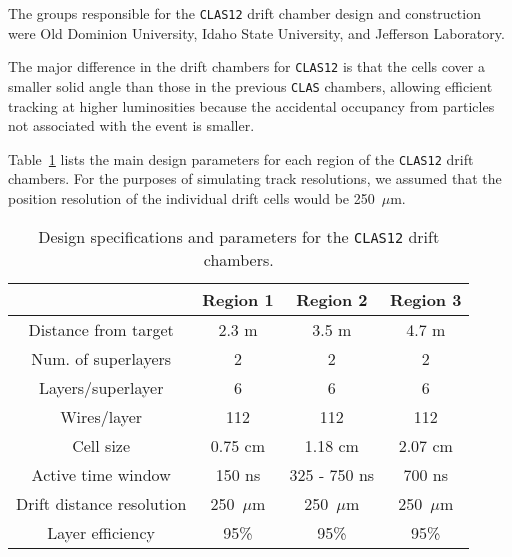 The groups responsible for the {\tt CLAS12} drift
chamber design and construction were Old Dominion University, Idaho State
University, and Jefferson Laboratory.

The major difference in the drift chambers for {\tt CLAS12} is that the 
cells cover a smaller solid angle than those in the previous {\tt CLAS} 
chambers, allowing efficient tracking at higher luminosities because the 
accidental occupancy from particles not associated with the event is smaller.  

Table~\ref{fwd-dc-design-parms} lists the main design parameters for each 
region of the {\tt CLAS12} drift chambers.  For the purposes of simulating 
track resolutions, we assumed that the position resolution of the individual 
drift cells would be 250~$\mu$m.  

\small{
\begin{table}[ht]
\begin{center}
\begin{tabular}{||c|c|c|c||} \hline \hline
            &{\bf Region 1}&{\bf Region 2}&{\bf Region 3}\\ \hline
Distance from target & 2.3 m    & 3.5 m        & 4.7 m    \\ \hline
Num. of superlayers  & 2        & 2            & 2        \\ \hline
Layers/superlayer    & 6        & 6            & 6        \\ \hline
Wires/layer          & 112      & 112          & 112      \\ \hline
Cell size            & 0.75 cm  & 1.18 cm      & 2.07 cm  \\ \hline
Active time window   & 150 ns   & 325 - 750 ns & 700 ns   \\ \hline
Drift distance resolution   & 250~$\mu$m   & 250~$\mu$m &250~$\mu$m  \\ \hline
Layer efficiency   &  95\%   &  95\%  & 95\%   \\ \hline
\end{tabular}
\caption{\small{Design specifications and parameters for the {\tt CLAS12} drift chambers.}}
\label{fwd-dc-design-parms}
\end{center}
\end{table}
}





